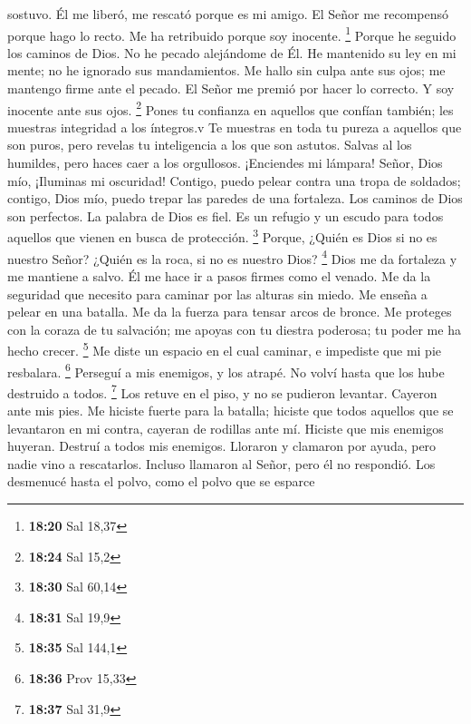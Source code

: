 sostuvo.  Él me liberó, me rescató porque es mi amigo.
 El Señor me recompensó porque hago lo recto. Me ha
retribuido porque soy inocente. \footnote{\textbf{18:20} Sal 18,37}
 Porque he seguido los caminos de Dios. No he pecado
alejándome de Él.  He mantenido su ley en mi mente; no he
ignorado sus mandamientos.  Me hallo sin culpa ante sus
ojos; me mantengo firme ante el pecado.  El Señor me premió
por hacer lo correcto. Y soy inocente ante sus ojos. \footnote{\textbf{18:24}
  Sal 15,2}  Pones tu confianza en aquellos que confían
también; les muestras integridad a los íntegros.v  Te
muestras en toda tu pureza a aquellos que son puros, pero revelas tu
inteligencia a los que son astutos.  Salvas al los
humildes, pero haces caer a los orgullosos.  ¡Enciendes mi
lámpara! Señor, Dios mío, ¡Iluminas mi oscuridad!  Contigo,
puedo pelear contra una tropa de soldados; contigo, Dios mío, puedo
trepar las paredes de una fortaleza.  Los caminos de Dios
son perfectos. La palabra de Dios es fiel. Es un refugio y un escudo
para todos aquellos que vienen en busca de protección. \footnote{\textbf{18:30}
  Sal 60,14}  Porque, ¿Quién es Dios si no es nuestro
Señor? ¿Quién es la roca, si no es nuestro Dios? \footnote{\textbf{18:31}
  Sal 19,9}  Dios me da fortaleza y me mantiene a salvo.
 Él me hace ir a pasos firmes como el venado. Me da la
seguridad que necesito para caminar por las alturas sin miedo.
 Me enseña a pelear en una batalla. Me da la fuerza para
tensar arcos de bronce.  Me proteges con la coraza de tu
salvación; me apoyas con tu diestra poderosa; tu poder me ha hecho
crecer. \footnote{\textbf{18:35} Sal 144,1}  Me diste un
espacio en el cual caminar, e impediste que mi pie resbalara.
\footnote{\textbf{18:36} Prov 15,33}  Perseguí a mis
enemigos, y los atrapé. No volví hasta que los hube destruido a todos.
\footnote{\textbf{18:37} Sal 31,9}  Los retuve en el piso,
y no se pudieron levantar. Cayeron ante mis pies.  Me
hiciste fuerte para la batalla; hiciste que todos aquellos que se
levantaron en mi contra, cayeran de rodillas ante mí. 
Hiciste que mis enemigos huyeran. Destruí a todos mis enemigos.
 Lloraron y clamaron por ayuda, pero nadie vino a
rescatarlos. Incluso llamaron al Señor, pero él no respondió.
 Los desmenucé hasta el polvo, como el polvo que se esparce
